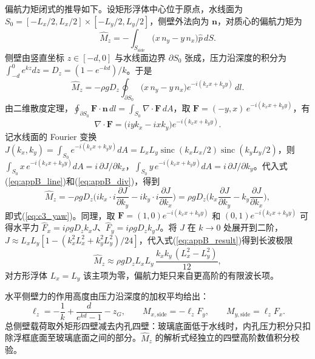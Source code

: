 偏航力矩闭式的推导如下。设矩形浮体中心位于原点，水线面为 $S_0=[-L_x/2,L_x/2]\times[-L_y/2,L_y/2]$，侧壁外法向为 $\mathbf n$，对质心的偏航力矩为
\begin{equation}
\hat M_z=-\int_{S_{\mathrm{side}}}\big(x\,n_y-y\,n_x\big)\hat p\,dS.
\label{eq:appB_Mz}
\end{equation}
侧壁由竖直坐标 $z\in[-d,0]$ 与水线面边界 $\partial S_0$ 张成，压力沿深度的积分为 $\int_{-d}^0e^{kz}dz=D_z=(1-e^{-kd})/k$。于是
\begin{equation}
\hat M_z=-\rho gD_z\oint_{\partial S_0}\big(x\,n_y-y\,n_x\big)e^{-i(k_xx+k_yy)}\,dl.
\label{eq:appB_line}
\end{equation}
由二维散度定理，$\oint_{\partial S_0}\mathbf F\cdot\mathbf n\,dl=\int_{S_0}\nabla\cdot\mathbf F\,dA$，取 $\mathbf F=(-y,x)\,e^{-i(k_xx+k_yy)}$，有
\begin{equation}
\nabla\cdot\mathbf F=\big(iyk_x-ixk_y\big)e^{-i(k_xx+k_yy)}.
\label{eq:appB_div}
\end{equation}
记水线面的 Fourier 变换 $J(k_x,k_y)=\int_{S_0}e^{-i(k_xx+k_yy)}dA=L_xL_y\operatorname{sinc}(k_xL_x/2)\operatorname{sinc}(k_yL_y/2)$，则 $\int_{S_0}x\,e^{-i(k_xx+k_yy)}dA=i\,\partial J/\partial k_x$，$\int_{S_0}y\,e^{-i(k_xx+k_yy)}dA=i\,\partial J/\partial k_y$。代入式(\ref{eq:appB_line})和(\ref{eq:appB_div})，得到
\begin{equation}
\hat M_z=-\rho gD_z\Big(ik_x\cdot i\frac{\partial J}{\partial k_y}-ik_y\cdot i\frac{\partial J}{\partial k_x}\Big)
=\rho gD_z\Big(k_x\frac{\partial J}{\partial k_y}-k_y\frac{\partial J}{\partial k_x}\Big),
\label{eq:appB_result}
\end{equation}
即式(\ref{eq:c3_yaw})。同理，取 $\mathbf F=(1,0)e^{-i(k_xx+k_yy)}$ 和 $(0,1)e^{-i(k_xx+k_yy)}$ 可得水平力 $\hat F_x=i\rho gD_zk_xJ$、$\hat F_y=i\rho gD_zk_yJ$。将 $J$ 在 $k\to0$ 处展开到二阶，$J\approx L_xL_y[1-(k_x^2L_x^2+k_y^2L_y^2)/24]$，代入式(\ref{eq:appB_result})得到长波极限
\begin{equation}
\hat M_z\approx\rho gD_zL_xL_y\,\frac{k_xk_y\,(L_x^2-L_y^2)}{12},
\label{eq:appB_long}
\end{equation}
对方形浮体 $L_x=L_y$ 该主项为零，偏航力矩只来自更高阶的有限波长项。

水平侧壁力的作用高度由压力沿深度的加权平均给出：
\begin{equation}
\ell_z=-\frac1k+\frac{d}{e^{kd}-1}-z_G,\qquad
M_{x,\mathrm{side}}=-\ell_zF_y,\qquad M_{y,\mathrm{side}}=\ell_zF_x.
\label{eq:c3_lever}
\end{equation}
总侧壁载荷取外矩形四壁减去内孔四壁：玻璃底面低于水线时，内孔压力积分只扣除浮框底面至玻璃底面之间的部分。$\hat M_z$ 的解析式经独立的四壁高阶数值积分校验。

